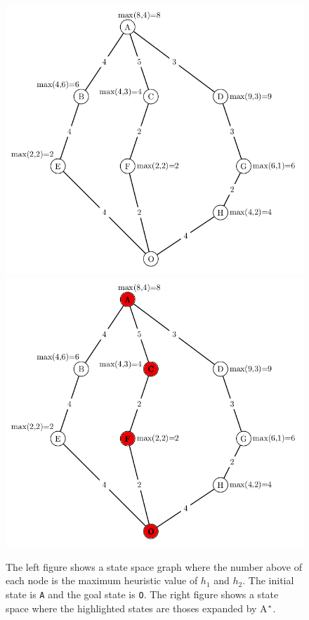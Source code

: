 \begin{figure}[!htb]
  \includegraphics[width=\linewidth]{images/marvinmaxfull-left}
\endminipage\hfill
{}
  \includegraphics[width=\linewidth]{images/marvinmaxfullacfG-right}
\endminipage
\caption{The left figure shows a state space graph where the number above of each node is the maximum heuristic value of $h_{1}$ and $h_{2}$. The initial state is \texttt{A} and the goal state is \texttt{O}. The right figure shows a state space where the highlighted states are thoses expanded by A$\sp{*}$. }\label{fig:image_maxh1h2_astar}
\end{figure}

